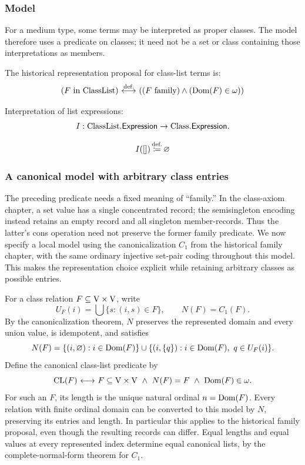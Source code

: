 \subsubsection{Model}
For a medium type, some terms may be interpreted as proper classes.
The model therefore uses a predicate on classes; it need not be a set
or class containing those interpretations as members.
\begin{definition}[inClassList]
The historical representation proposal for class-list terms is:
\[
(F\text{ in ClassList})
\ {\stackrel{{\textrm{def.}}}{\longleftrightarrow}}\ 
(
(F\mathrm{\ family})
\land
(\mathrm{Dom}(F)\in\omega)
)
\]%
\end{definition}
Interpretation of list expressions:
\[
I:\mathrm{ClassList}.\mathsf{Expression}\to{\text{Class}}.\mathsf{Expression}.
\]
\begin{definition}[nil]
\[
I([]) \,{\stackrel{{\textrm{def.}}}{\coloneqq}}\, \varnothing
\]
\end{definition}

\subsubsection{A canonical model with arbitrary class entries}
The preceding predicate needs a fixed meaning of ``family.'' In the
class-axiom chapter, a set value has a single concentrated record;
the semisingleton encoding instead retains an empty record and all
singleton member-records. Thus the latter's cons operation need not
preserve the former family predicate. We now specify a local model
using the canonicalization $C_1$ from the historical family chapter,
with the same ordinary injective set-pair coding throughout this model.
This makes the representation choice explicit while retaining arbitrary
classes as possible entries.

For a class relation $F\subseteq\mathrm{V}\times\mathrm{V}$, write
\[
U_F(i)=\bigcup\{s:(i,s)\in F\},\qquad N(F)=C_1(F).
\]
By the canonicalization theorem, $N$ preserves the represented domain
and every union value, is idempotent, and satisfies
\[
N(F)=\{(i,\varnothing):i\in\mathrm{Dom}(F)\}
 \cup\{(i,\{q\}):i\in\mathrm{Dom}(F),\ q\in U_F(i)\}.
\]
Define the canonical class-list predicate by
\[
\operatorname{CL}(F){\ \longleftrightarrow\ }
 F\subseteq\mathrm{V}\times\mathrm{V}\ \land\ N(F)=F\ \land\ \mathrm{Dom}(F)\in\omega.
\]
For such an $F$, its length is the unique natural ordinal
$n=\mathrm{Dom}(F)$. Every relation with finite ordinal domain can be converted
to this model by $N$, preserving its entries and length. In particular
this applies to the historical family proposal, even though the resulting
records can differ. Equal lengths and equal values at every represented
index determine equal canonical lists, by the complete-normal-form
theorem for $C_1$.

